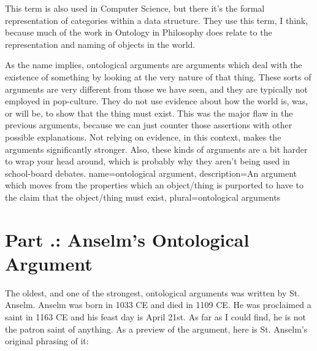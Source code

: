 This term is also used in Computer Science, but there it's the formal representation of categories within a data structure. They use this term, I think, because much of the work in Ontology in Philosophy does relate to the representation and naming of objects in the world. 

As the name implies, \glspl{ontological argument} are arguments which deal with the existence of something by looking at the very nature of that thing. These sorts of arguments are very different from those we have seen, and they are typically not employed in pop-culture. They do not use evidence about how the world is, was, or will be, to show that the thing must exist. This was the major flaw in the previous arguments, because we can just counter those assertions with other possible explanations. Not relying on evidence, in this context, makes the arguments significantly stronger. Also, these kinds of arguments are a bit harder to wrap your head around, which is probably why they aren't being used in school-board debates.
{
name=ontological argument,
description={An argument which moves from the properties which an object/thing is purported to have to the claim that the object/thing must exist},
plural=ontological arguments
}

\section{Part \thechapcount.\theseccount: Anselm’s Ontological Argument}

The oldest, and one of the strongest, ontological arguments was written by St. Anselm. Anselm was born in 1033 CE and died in 1109 CE. He was proclaimed a saint in 1163 CE and his feast day is April 21st. As far as I could find, he is not the patron saint of anything. As a preview of the argument, here is St. Anselm's original phrasing of it:

